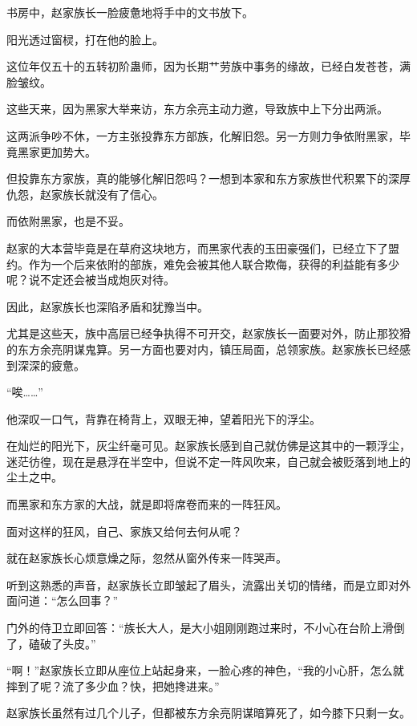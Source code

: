 
\begin{this_body}

书房中，赵家族长一脸疲惫地将手中的文书放下。

阳光透过窗棂，打在他的脸上。

这位年仅五十的五转初阶蛊师，因为长期艹劳族中事务的缘故，已经白发苍苍，满脸皱纹。

这些天来，因为黑家大举来访，东方余亮主动力邀，导致族中上下分出两派。

这两派争吵不休，一方主张投靠东方部族，化解旧怨。另一方则力争依附黑家，毕竟黑家更加势大。

但投靠东方家族，真的能够化解旧怨吗？一想到本家和东方家族世代积累下的深厚仇怨，赵家族长就没有了信心。

而依附黑家，也是不妥。

赵家的大本营毕竟是在草府这块地方，而黑家代表的玉田豪强们，已经立下了盟约。作为一个后来依附的部族，难免会被其他人联合欺侮，获得的利益能有多少呢？说不定还会被当成炮灰对待。

因此，赵家族长也深陷矛盾和犹豫当中。

尤其是这些天，族中高层已经争执得不可开交，赵家族长一面要对外，防止那狡猾的东方余亮阴谋鬼算。另一方面也要对内，镇压局面，总领家族。赵家族长已经感到深深的疲惫。

“唉……”

他深叹一口气，背靠在椅背上，双眼无神，望着阳光下的浮尘。

在灿烂的阳光下，灰尘纤毫可见。赵家族长感到自己就仿佛是这其中的一颗浮尘，迷茫彷徨，现在是悬浮在半空中，但说不定一阵风吹来，自己就会被贬落到地上的尘土之中。

而黑家和东方家的大战，就是即将席卷而来的一阵狂风。

面对这样的狂风，自己、家族又给何去何从呢？

就在赵家族长心烦意燥之际，忽然从窗外传来一阵哭声。

听到这熟悉的声音，赵家族长立即皱起了眉头，流露出关切的情绪，而是立即对外面问道：“怎么回事？”

门外的侍卫立即回答：“族长大人，是大小姐刚刚跑过来时，不小心在台阶上滑倒了，磕破了头皮。”

“啊！”赵家族长立即从座位上站起身来，一脸心疼的神色，“我的小心肝，怎么就摔到了呢？流了多少血？快，把她搀进来。”

赵家族长虽然有过几个儿子，但都被东方余亮阴谋暗算死了，如今膝下只剩一女。


\end{this_body}
